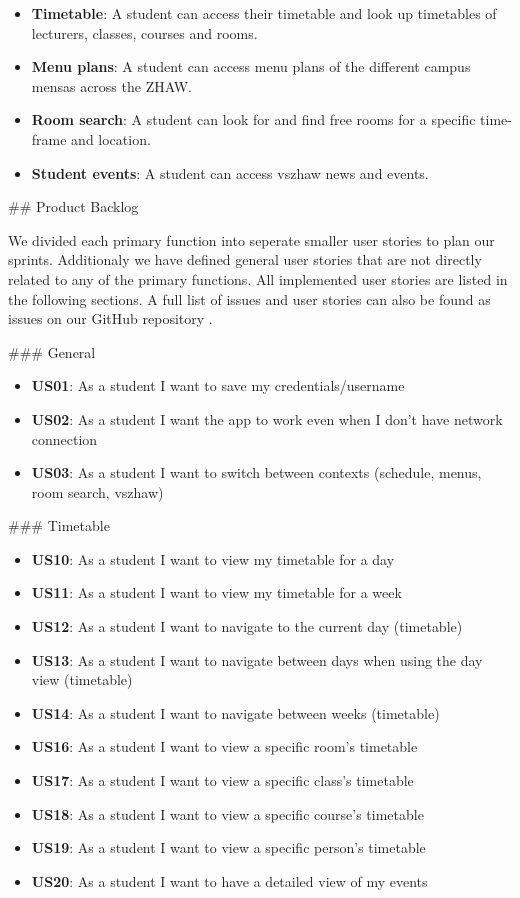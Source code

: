 \begin{markdown}
\begin{itemize}
  \item \textbf{Timetable}: A student can access their timetable and look up timetables of lecturers, classes, courses and rooms.
  \item \textbf{Menu plans}: A student can access menu plans of the different campus mensas across the ZHAW.
  \item \textbf{Room search}: A student can look for and find free rooms for a specific time-frame and location.
  \item \textbf{Student events}: A student can access vszhaw news and events.
\end{itemize}

\newpage

## Product Backlog

We divided each primary function into seperate smaller user stories to plan our sprints. Additionaly we have defined general user stories that are not directly related to any of the primary functions. All implemented user stories are listed in the following sections. A full list of issues and user stories can also be found as issues on our GitHub repository \cite{OurGithub}.

### General

\begin{itemize}
  \item \textbf{US01}: As a student I want to save my credentials/username
  \item \textbf{US02}: As a student I want the app to work even when I don't have network connection
  \item \textbf{US03}: As a student I want to switch between contexts (schedule, menus, room search, vszhaw)
\end{itemize}

### Timetable

\begin{itemize}
  \item \textbf{US10}: As a student I want to view my timetable for a day
  \item \textbf{US11}: As a student I want to view my timetable for a week
  \item \textbf{US12}: As a student I want to navigate to the current day (timetable)
  \item \textbf{US13}: As a student I want to navigate between days when using the day view (timetable)
  \item \textbf{US14}: As a student I want to navigate between weeks (timetable)
  \item \textbf{US16}: As a student I want to view a specific room's timetable
  \item \textbf{US17}: As a student I want to view a specific class's timetable
  \item \textbf{US18}: As a student I want to view a specific course's timetable
  \item \textbf{US19}: As a student I want to view a specific person's timetable
  \item \textbf{US20}: As a student I want to have a detailed view of my events
\end{itemize}


\end{markdown}
